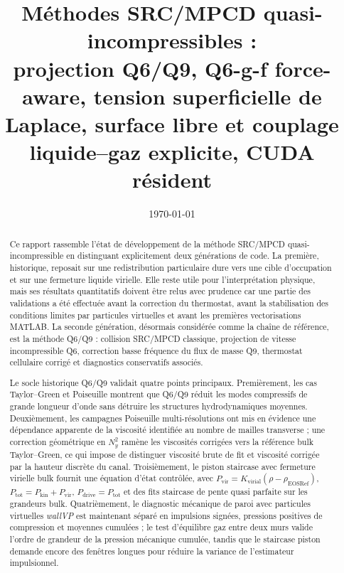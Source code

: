 \documentclass[11pt,a4paper]{article}
\title{Méthodes SRC/MPCD quasi-incompressibles :\\ projection Q6/Q9, Q6-g-f force-aware, tension superficielle de Laplace, surface libre et couplage liquide--gaz explicite, CUDA résident}
\author{}
\date{\today}
\begin{document}
\maketitle



\begin{abstract}
Ce rapport rassemble l'état de développement de la méthode SRC/MPCD quasi-incompressible en distinguant explicitement deux générations de code. La première, historique, reposait sur une redistribution particulaire dure vers une cible d'occupation et sur une fermeture liquide virielle. Elle reste utile pour l'interprétation physique, mais ses résultats quantitatifs doivent être relus avec prudence car une partie des validations a été effectuée avant la correction du thermostat, avant la stabilisation des conditions limites par particules virtuelles et avant les premières vectorisations MATLAB. La seconde génération, désormais considérée comme la chaîne de référence, est la méthode Q6/Q9 : collision SRC/MPCD classique, projection de vitesse incompressible Q6, correction basse fréquence du flux de masse Q9, thermostat cellulaire corrigé et diagnostics conservatifs associés.

Le socle historique Q6/Q9 validait quatre points principaux. Premièrement, les cas Taylor--Green et Poiseuille montrent que Q6/Q9 réduit les modes compressifs de grande longueur d'onde sans détruire les structures hydrodynamiques moyennes. Deuxièmement, les campagnes Poiseuille multi-résolutions ont mis en évidence une dépendance apparente de la viscosité identifiée au nombre de mailles transverse ; une correction géométrique en \(N_y^2\) ramène les viscosités corrigées vers la référence bulk Taylor--Green, ce qui impose de distinguer viscosité brute de fit et viscosité corrigée par la hauteur discrète du canal. Troisièmement, le piston staircase avec fermeture virielle bulk fournit une équation d'état contrôlée, avec \(P_{\mathrm{vir}}=K_{\mathrm{virial}}(\rho-\rho_{\mathrm{EOSRef}})\), \(P_{\mathrm{tot}}=P_{\mathrm{kin}}+P_{\mathrm{vir}}\), \(P_{\mathrm{drive}}=P_{\mathrm{tot}}\) et des fits staircase de pente quasi parfaite sur les grandeurs bulk. Quatrièmement, le diagnostic mécanique de paroi avec particules virtuelles \emph{wallVP} est maintenant séparé en impulsions signées, pressions positives de compression et moyennes cumulées ; le test d'équilibre gaz entre deux murs valide l'ordre de grandeur de la pression mécanique cumulée, tandis que le staircase piston demande encore des fenêtres longues pour réduire la variance de l'estimateur impulsionnel.




\end{abstract}
\end{document}
